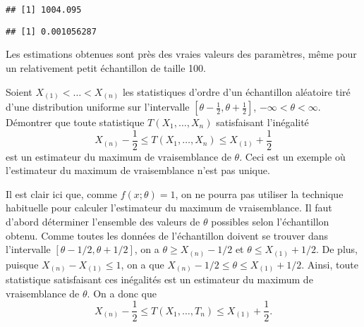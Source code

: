 \begin{exercice}
\begin{sol}
\begin{enumerate}
\begin{knitrout}
\begin{kframe}
\begin{alltt}
\end{alltt}
\begin{verbatim}
## [1] 1004.095
\end{verbatim}
\begin{alltt}
 \hlopt{/}  \hlopt{-} 
\end{alltt}
\begin{verbatim}
## [1] 0.001056287
\end{verbatim}
\end{kframe}
\end{knitrout}
      Les estimations obtenues sont près des vraies valeurs des
      paramètres, même pour un relativement petit échantillon de
      taille 100.
    \end{enumerate}
  \end{sol}
\end{exercice}

\begin{exercice}
  Soient $X_{(1)} < \dots < X_{(n)}$ les statistiques d'ordre d'un
  échantillon aléatoire tiré d'une distribution uniforme sur
  l'intervalle $[\theta - \frac{1}{2}, \theta + \frac{1}{2}]$,
  $-\infty < \theta < \infty$. Démontrer que toute statistique $T(X_1,
  \dots, X_n)$ satisfaisant l'inégalité
  \begin{displaymath}
    X_{(n)} - \frac{1}{2} \leq T(X_1, \dots, X_n) \leq
    X_{(1)} + \frac{1}{2}
  \end{displaymath}
  est un estimateur du maximum de vraisemblance de $\theta$. Ceci est
  un exemple où l'estimateur du maximum de
  vraisemblance n'est pas unique.
  \begin{sol}
    Il est clair ici que, comme $f(x;\theta) = 1$, on ne pourra pas
    utiliser la technique habituelle pour calculer l'estimateur du
    maximum de vraisemblance. Il faut d'abord déterminer l'ensemble
    des valeurs de $\theta$ possibles selon l'échantillon obtenu.
    Comme toutes les données de l'échantillon doivent se trouver dans
    l'intervalle $[\theta - 1/2, \theta + 1/2]$, on a $\theta \geq
    X_{(n)} - 1/2$ et $\theta \leq X_{(1)} + 1/2$. De plus, puisque
    $X_{(n)} - X_{(1)} \leq 1$, on a que $X_{(n)} - 1/2 \leq \theta
    \leq X_{(1)} + 1/2$. Ainsi, toute statistique satisfaisant ces
    inégalités est un estimateur du maximum de vraisemblance de
    $\theta$. On a donc que
    \begin{displaymath}
      X_{(n)} - \frac{1}{2} \leq T(X_1, \dots, T_n) \leq X_{(1)} + \frac{1}{2}.
    \end{displaymath}
  \end{sol}
\end{exercice}

